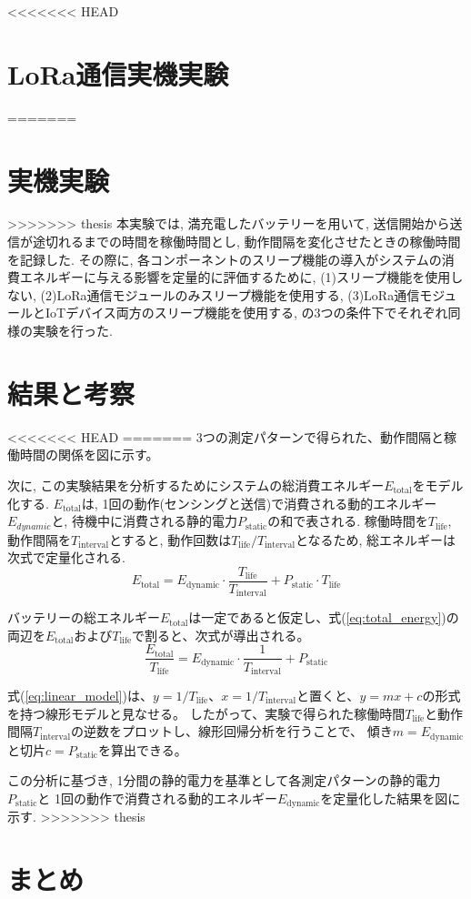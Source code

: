 \documentclass[lualatex, twocolumn]{ltjsarticle}
\begin{document}
<<<<<<< HEAD
\section{LoRa通信実機実験}
=======
\section{実機実験}
>>>>>>> thesis
本実験では, 満充電したバッテリーを用いて, 送信開始から送信が途切れるまでの時間を稼働時間とし,
動作間隔を変化させたときの稼働時間を記録した. 
その際に, 各コンポーネントのスリープ機能の導入がシステムの消費エネルギーに与える影響を定量的に評価するために,
(1)スリープ機能を使用しない, (2)LoRa通信モジュールのみスリープ機能を使用する, (3)LoRa通信モジュールとIoTデバイス両方のスリープ機能を使用する, の3つの条件下でそれぞれ同様の実験を行った.

\section{結果と考察}
<<<<<<< HEAD
=======
3つの測定パターンで得られた、動作間隔と稼働時間の関係を図に示す。

次に, この実験結果を分析するためにシステムの総消費エネルギー$E_{\mathrm{total}}$をモデル化する. 
$E_{\mathrm{total}}$は, 1回の動作(センシングと送信)で消費される動的エネルギー$E_{dynamic}$と, 
待機中に消費される静的電力$P_{\mathrm{static}}$の和で表される.
稼働時間を$T_{\mathrm{life}}$, 動作間隔を$T_{\mathrm{interval}}$とすると, 動作回数は$T_{\mathrm{life}}/T_{\mathrm{interval}}$となるため, 総エネルギーは次式で定量化される. 
\begin{equation}
    E_{\mathrm{total}} = E_{{\mathrm{dynamic}}} \cdot \frac{T_{\mathrm{life}}}{T_{\mathrm{interval}}} + P_{\mathrm{static}} \cdot T_{\mathrm{life}}
    \label{eq:total_energy}
\end{equation}

バッテリーの総エネルギー$E_{\mathrm{total}}$は一定であると仮定し、式(\ref{eq:total_energy})の両辺を$E_{\mathrm{total}}$および$T_{\mathrm{life}}$で割ると、次式が導出される。
\begin{equation}
  \frac{E_{\mathrm{total}}}{T_{\mathrm{life}}} = E_{\mathrm{dynamic}} \cdot \frac{1}{T_{\mathrm{interval}}} + {P_{\mathrm{static}}}
  \label{eq:linear_model}
\end{equation}

式(\ref{eq:linear_model})は、$y = 1/T_{\mathrm{life}}$、$x = 1/T_{\mathrm{interval}}$と置くと、$y=mx+c$の形式を持つ線形モデルと見なせる。
したがって、実験で得られた稼働時間$T_{\mathrm{life}}$と動作間隔$T_{\mathrm{interval}}$の逆数をプロットし、線形回帰分析を行うことで、
傾き$m=E_{\mathrm{dynamic}}$と切片$c=P_{\mathrm{static}}$を算出できる。

この分析に基づき, 1分間の静的電力を基準として各測定パターンの静的電力$P_{\mathrm{static}}$と
1回の動作で消費される動的エネルギー$E_{\mathrm{dynamic}}$を定量化した結果を図に示す.
>>>>>>> thesis

\section{まとめ}
\end{document}
